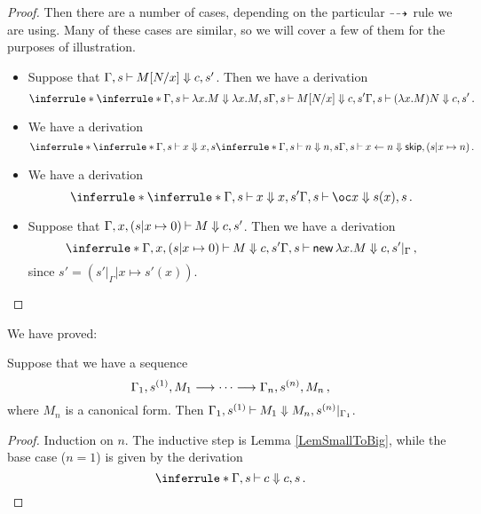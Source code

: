 \documentclass[11pt]{report}
\begin{document}
\begin{proof}
  Then there are a number of cases, depending on the particular $\dashrightarrow$ rule we are using.  
  Many of these cases are similar, so we will cover a few of them for the purposes of illustration.
  \begin{itemize}
    \item Suppose that $\Gamma,s\mathbin{\vdash} M[N/x]\Downarrow c,s'$.  
      Then we have a derivation
      \[
        \inferrule*
        {
          \inferrule*
          {
          }
          {
            \Gamma,s \ts \lambda x.M \converges \lambda x.M,s
          }
          \\
          \Gamma,s\ts M[N/x] \converges c,s'
        }
        {
          \Gamma,s\ts (\lambda x.M)N \converges c,s'
        }\,.
        \]
    \item We have a derivation
      \[
        \inferrule*
        {
          \inferrule*
          {
          }
          {
            \Gamma,s\ts x\converges x,s
          }
          \\
          \inferrule*
          {
          }
          {
            \Gamma,s\ts n\converges n,s
          }
        }
        {
          \Gamma,s\ts x\gets n\converges \skipp,(s\vert x\mapsto n)
        }\,.
        \]
    \item We have a derivation
      \[
        \inferrule*
        {
          \inferrule*
          {
          }
          {
            \Gamma,s\ts x \converges x,s'
          }
        }
        {
          \Gamma,s\ts \oc x\converges s(x),s
        }\,.
        \]
    \item Suppose that $\Gamma,x,(s\vert x\mapsto 0) \mathbin{\vdash} M\Downarrow c,s'$.  
      Then we have a derivation
      \[
        \inferrule*
        {
          \Gamma,x,(s\vert x\mapsto 0) \ts M \converges c,s'
        }
        {
          \Gamma,s\ts \neww\lambda x.M \converges c,s'\vert_\Gamma
        }\,,
        \]
      since $s'=(s'\vert_\Gamma\vert x\mapsto s'(x))$.\qedhere
  \end{itemize}
\end{proof}

We have proved:

\begin{proposition}
  Suppose that we have a sequence
  \[
    \Gamma_1,s^{(1)},M_1\longrightarrow\cdots\longrightarrow\Gamma_n,s^{(n)},M_n\,,
    \]
  where $M_n$ is a canonical form.  
  Then $\Gamma_1,s^{(1)} \mathbin{\vdash} M_1\Downarrow M_n,s^{(n)}\vert_{\Gamma_1}$.  
  \label{PropSmallToBig}
\end{proposition}
\begin{proof}
  Induction on $n$.  
  The inductive step is Lemma \ref{LemSmallToBig}, while the base case ($n=1$) is given by the derivation
  \[
    \inferrule*{ }
    {\Gamma,s\ts c\converges c,s}\,.\qedhere
    \]
\end{proof}
\end{document}
